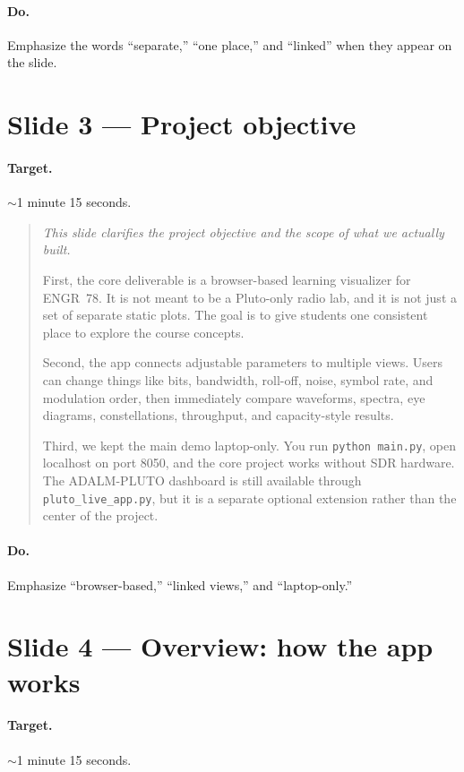 \documentclass[11pt,a4paper]{article}
\newcommand{\speak}[1]{%
  \begin{quote}\itshape #1\end{quote}%
}
\newcommand{\doitem}[1]{\paragraph{Do.} #1\par\vspace{0.6em}}
\begin{document}
\doitem{Emphasize the words ``separate,'' ``one place,'' and ``linked'' when they appear on the slide.}

\section{Slide 3 --- Project objective}

\paragraph{Target.} $\sim$1 minute 15 seconds.

\speak{%
This slide clarifies the project objective and the scope of what we actually built.

First, the core deliverable is a browser-based learning visualizer for ENGR~78. It is not meant to be a Pluto-only radio lab, and it is not just a set of separate static plots. The goal is to give students one consistent place to explore the course concepts.

Second, the app connects adjustable parameters to multiple views. Users can change things like bits, bandwidth, roll-off, noise, symbol rate, and modulation order, then immediately compare waveforms, spectra, eye diagrams, constellations, throughput, and capacity-style results.

Third, we kept the main demo laptop-only. You run \texttt{python main.py}, open localhost on port 8050, and the core project works without SDR hardware. The ADALM-PLUTO dashboard is still available through \texttt{pluto\_live\_app.py}, but it is a separate optional extension rather than the center of the project.%
}

\doitem{Emphasize ``browser-based,'' ``linked views,'' and ``laptop-only.''}

\section{Slide 4 --- Overview: how the app works}

\paragraph{Target.} $\sim$1 minute 15 seconds.
\end{document}
